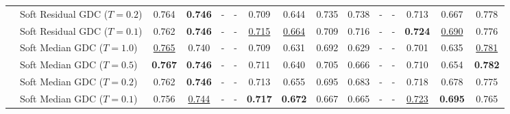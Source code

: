 \documentclass{article} %
\begin{document}
\begin{table}
{\begin{tabular}{llccccccccccccc}
                           & Soft Residual GDC ($T=0.2$) &              0.764 &     \textbf{0.746} &                  - &                  - &              0.709 &              0.644 &              0.735 &              0.738 &                  - &                  - &              0.713 &              0.667 &              0.778 \\
                           & Soft Residual GDC ($T=0.1$) &              0.762 &     \textbf{0.746} &                  - &                  - &  \underline{0.715} &  \underline{0.664} &              0.709 &              0.716 &                  - &                  - &     \textbf{0.724} &  \underline{0.690} &              0.776 \\
                           & Soft Median GDC ($T=1.0$) &  \underline{0.765} &              0.740 &                  - &                  - &              0.709 &              0.631 &              0.692 &              0.629 &                  - &                  - &              0.701 &              0.635 &  \underline{0.781} \\
                           & Soft Median GDC ($T=0.5$) &     \textbf{0.767} &     \textbf{0.746} &                  - &                  - &              0.711 &              0.640 &              0.705 &              0.666 &                  - &                  - &              0.710 &              0.654 &     \textbf{0.782} \\
                           & Soft Median GDC ($T=0.2$) &              0.762 &     \textbf{0.746} &                  - &                  - &              0.713 &              0.655 &              0.695 &              0.683 &                  - &                  - &              0.718 &              0.678 &              0.775 \\
                           & Soft Median GDC ($T=0.1$) &              0.756 &  \underline{0.744} &                  - &                  - &     \textbf{0.717} &     \textbf{0.672} &              0.667 &              0.665 &                  - &                  - &  \underline{0.723} &     \textbf{0.695} &              0.765 \\
    \bottomrule
    \end{tabular}
}
\end{table}
\end{document}

